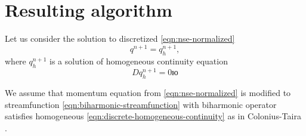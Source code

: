 \documentclass{article}
\numberwithin{equation}{section}
\begin{document}
\pagebreak
\section{Resulting algorithm}\label{sec:algorithm}

Let us consider the solution to discretized \cref{eqn:nse-normalized}
\begin{equation*}
	q^{n+1}=q^{n+1}_h,
\end{equation*}
where $q^{n+1}_h$ is a solution of homogeneous continuity equation 
\begin{equation}\label{eqn:discrete-homogeneous-continuity}
	Dq^{n+1}_h=0ю
\end{equation}


We assume that momentum equation from \cref{eqn:nse-normalized} is modified to streamfunction \cref{eqn:biharmonic-streamfunction} with biharmonic operator satisfies homogeneous \cref{eqn:discrete-homogeneous-continuity} as in Colonius-Taira \cite{Colonius:2008}. 
\end{document}
